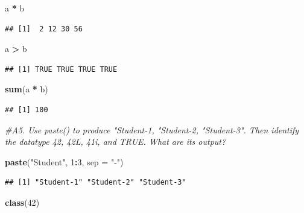 \documentclass[
]{article}
\newenvironment{Shaded}{\begin{snugshade}}{\end{snugshade}}
\newcommand{\AttributeTok}[1]{\textcolor[rgb]{0.13,0.29,0.53}{#1}}
\newcommand{\CommentTok}[1]{\textcolor[rgb]{0.56,0.35,0.01}{\textit{#1}}}
\newcommand{\DecValTok}[1]{\textcolor[rgb]{0.00,0.00,0.81}{#1}}
\newcommand{\FunctionTok}[1]{\textcolor[rgb]{0.13,0.29,0.53}{\textbf{#1}}}
\newcommand{\NormalTok}[1]{#1}
\newcommand{\SpecialCharTok}[1]{\textcolor[rgb]{0.81,0.36,0.00}{\textbf{#1}}}
\newcommand{\StringTok}[1]{\textcolor[rgb]{0.31,0.60,0.02}{#1}}
\begin{document}
\begin{Shaded}
\begin{Highlighting}[]
\NormalTok{a }\SpecialCharTok{*}\NormalTok{ b}
\end{Highlighting}
\end{Shaded}

\begin{verbatim}
## [1]  2 12 30 56
\end{verbatim}

\begin{Shaded}
\begin{Highlighting}[]
\NormalTok{a }\SpecialCharTok{\textgreater{}}\NormalTok{ b}
\end{Highlighting}
\end{Shaded}

\begin{verbatim}
## [1] TRUE TRUE TRUE TRUE
\end{verbatim}

\begin{Shaded}
\begin{Highlighting}[]
\FunctionTok{sum}\NormalTok{(a }\SpecialCharTok{*}\NormalTok{ b)}
\end{Highlighting}
\end{Shaded}

\begin{verbatim}
## [1] 100
\end{verbatim}

\begin{Shaded}
\begin{Highlighting}[]
\CommentTok{\#A5. Use paste() to produce "Student{-}1, "Student{-}2, "Student{-}3". Then identify the datatype 42, 42L, 41i, and TRUE. What are its output?}

\FunctionTok{paste}\NormalTok{(}\StringTok{"Student"}\NormalTok{, }\DecValTok{1}\SpecialCharTok{:}\DecValTok{3}\NormalTok{, }\AttributeTok{sep =} \StringTok{"{-}"}\NormalTok{)}
\end{Highlighting}
\end{Shaded}

\begin{verbatim}
## [1] "Student-1" "Student-2" "Student-3"
\end{verbatim}

\begin{Shaded}
\begin{Highlighting}[]
\FunctionTok{class}\NormalTok{(}\DecValTok{42}\NormalTok{)}
\end{Highlighting}
\end{Shaded}
\end{document}
